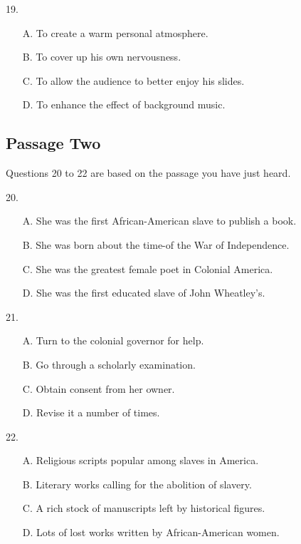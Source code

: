 \documentclass[UTF8,11pt]{ctexart}
\begin{document}
19.


\begin{itemize}[leftmargin=2em,itemsep=.2em,topsep=.4em]\item[A.] To create a warm personal atmosphere.
\item[B.] To cover up his own nervousness.
\item[C.] To allow the audience to better enjoy his slides.
\item[D.] To enhance the effect of background music.
\end{itemize}

\subsection*{Passage Two}


Questions 20 to 22 are based on the passage you have just heard.


20.


\begin{itemize}[leftmargin=2em,itemsep=.2em,topsep=.4em]\item[A.] She was the first African-American slave to publish a book.
\item[B.] She was born about the time-of the War of Independence.
\item[C.] She was the greatest female poet in Colonial America.
\item[D.] She was the first educated slave of John Wheatley’s.
\end{itemize}

21.


\begin{itemize}[leftmargin=2em,itemsep=.2em,topsep=.4em]\item[A.] Turn to the colonial governor for help.
\item[B.] Go through a scholarly examination.
\item[C.] Obtain consent from her owner.
\item[D.] Revise it a number of times.
\end{itemize}

22.


\begin{itemize}[leftmargin=2em,itemsep=.2em,topsep=.4em]\item[A.] Religious scripts popular among slaves in America.
\item[B.] Literary works calling for the abolition of slavery.
\item[C.] A rich stock of manuscripts left by historical figures.
\item[D.] Lots of lost works written by African-American women.
\end{itemize}
\end{document}
